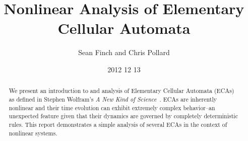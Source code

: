 \documentclass{article}
\author{Sean Finch and Chris Pollard}
\date{2012 12 13}
\title{Nonlinear Analysis of Elementary Cellular Automata}
\begin{document}
\maketitle

\vspace{3in}

\begin{abstract}
    We present an introduction to and analysis of Elementary Cellular
    Automata (ECAs) as defined in Stephen Wolfram's
    \emph{A New Kind of Science}~\cite{anks}.
    ECAs are inherently nonlinear and their time evolution can
    exhibit extremely complex behavior--an unexpected feature given
    that their dynamics are governed by completely deterministic
    rules.
    This report demonstrates a simple analysis of several ECAs in the
    context of nonlinear systems.
\end{abstract}

\newpage









\end{document}
